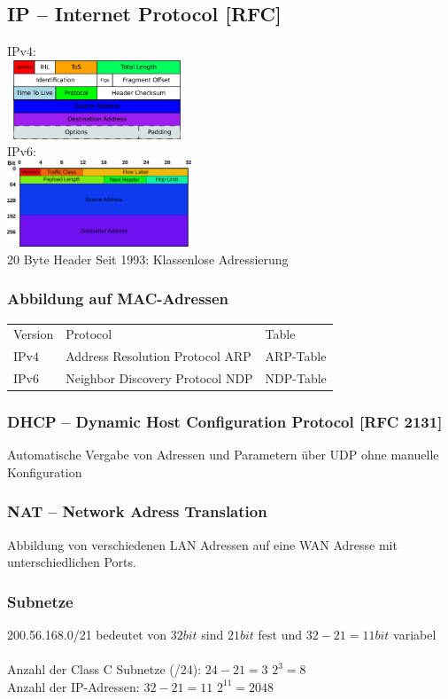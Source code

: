 \documentclass[fs, footer]{latex4ei}
\begin{document}
\begin{multicols*}{4}
	\subsection{IP -- Internet Protocol [RFC]}
	\noindent IPv4:\\
	\indent \quad\ \includegraphics[width = 5cm]{./img/IPv4_header.pdf} \\
	IPv6:\\
	\includegraphics[width = 5.5cm]{./img/IPv6_header.pdf} \\

	20 Byte Header
	Seit 1993: Klassenlose Adressierung

		\subsubsection{Abbildung auf MAC-Adressen}
		\begin{tabular}{lll}
		Version & Protocol & Table\\ \mrule
		IPv4 & Address Resolution Protocol ARP & ARP-Table\\
		IPv6 & Neighbor Discovery Protocol NDP & NDP-Table\\
		\end{tabular}

		\subsubsection{DHCP -- Dynamic Host Configuration Protocol [RFC 2131]}
		Automatische Vergabe von Adressen und Parametern über UDP ohne manuelle Konfiguration

		\subsubsection{NAT -- Network Adress Translation}
		Abbildung von verschiedenen LAN Adressen auf eine WAN Adresse mit unterschiedlichen Ports.

		\subsubsection{Subnetze}
		200.56.168.0/21 bedeutet von $32 \si{bit}$ sind $21 \si{bit}$ fest und $32-21 = 11 \si{bit}$ variabel\\
		\\
		Anzahl der Class C Subnetze (/24): $24-21 = 3$ \quad $2^{3} = 8$\\
		Anzahl der IP-Adressen: $32 - 21 = 11$ \quad $2^{11} = 2048$



\end{multicols*}
\end{document}
